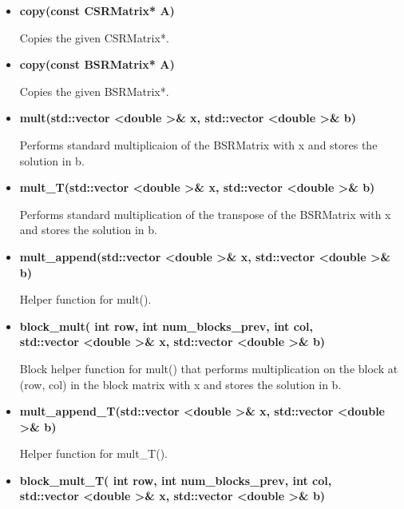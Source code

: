\documentclass{article}
\newcommand\tab[1][1cm]{\hspace*{#1}}
\begin{document}
\begin{itemize}
        \item \textbf{copy(const CSRMatrix* A)}
        
            Copies the given CSRMatrix*.
        
        \item \textbf{copy(const BSRMatrix* A)}
        
            Copies the given BSRMatrix*.
        
        \item \textbf{mult(std::vector \textless double \textgreater\& x, 
                std::vector \textless double \textgreater\& b)}
                
            Performs standard multiplicaion of the BSRMatrix with x and stores
            the solution in b.
        
        \item \textbf{mult\_T(std::vector \textless double \textgreater\& x, 
                std::vector \textless double \textgreater\& b)}
            
            Performs standard multiplication of the transpose of the BSRMatrix
            with x and stores the solution in b.
                
        \item \textbf{mult\_append(std::vector \textless double \textgreater\& x, 
                std::vector \textless double \textgreater\& b)}
                
            Helper function for mult().
                
        \item \textbf{block\_mult( int row, int num\_blocks\_prev, int col, \\
            \tab std::vector \textless double \textgreater\& x, 
                 std::vector \textless double \textgreater\& b)}
            
            Block helper function for mult() that performs multiplication on the
            block at (row, col) in the block matrix with x and stores the solution in b.
                
        \item \textbf{mult\_append\_T(std::vector \textless double \textgreater\& x, 
                std::vector \textless double \textgreater\& b)}
                
            Helper function for mult\_T().
                
        \item \textbf{block\_mult\_T( int row, int num\_blocks\_prev, int col,  \\
            \tab std::vector \textless double \textgreater\& x, 
                 std::vector \textless double \textgreater\& b)}
                 

\end{itemize}
\end{document}
